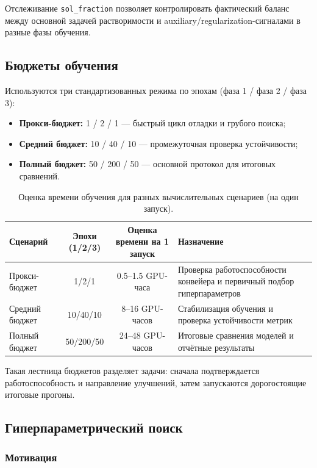 \documentclass[11pt]{article}
\begin{document}
Отслеживание \texttt{sol\_fraction} позволяет контролировать фактический баланс между основной задачей растворимости и auxiliary/regularization-сигналами в разные фазы обучения.

\subsection{Бюджеты обучения}

Используются три стандартизованных режима по эпохам (фаза 1 / фаза 2 / фаза 3):
\begin{itemize}
  \item \textbf{Прокси-бюджет:} 1 / 2 / 1 --- быстрый цикл отладки и грубого поиска;
  \item \textbf{Средний бюджет:} 10 / 40 / 10 --- промежуточная проверка устойчивости;
  \item \textbf{Полный бюджет:} 50 / 200 / 50 --- основной протокол для итоговых сравнений.
\end{itemize}

\begin{table}[H]
\centering
\small
\begin{tabular}{|l|c|c|p{5.1cm}|}
\hline
Сценарий & Эпохи (1/2/3) & Оценка времени на 1 запуск & Назначение \\
\hline
Прокси-бюджет & 1/2/1 & 0.5--1.5 GPU-часа & Проверка работоспособности конвейера и первичный подбор гиперпараметров \\
\hline
Средний бюджет & 10/40/10 & 8--16 GPU-часов & Стабилизация обучения и проверка устойчивости метрик \\
\hline
Полный бюджет & 50/200/50 & 24--48 GPU-часов & Итоговые сравнения моделей и отчётные результаты \\
\hline
\end{tabular}
\caption{Оценка времени обучения для разных вычислительных сценариев (на один запуск).}
\end{table}

Такая лестница бюджетов разделяет задачи: сначала подтверждается работоспособность и направление улучшений, затем запускаются дорогостоящие итоговые прогоны.

\subsection{Гиперпараметрический поиск}

\subsubsection{Мотивация}
\end{document}
